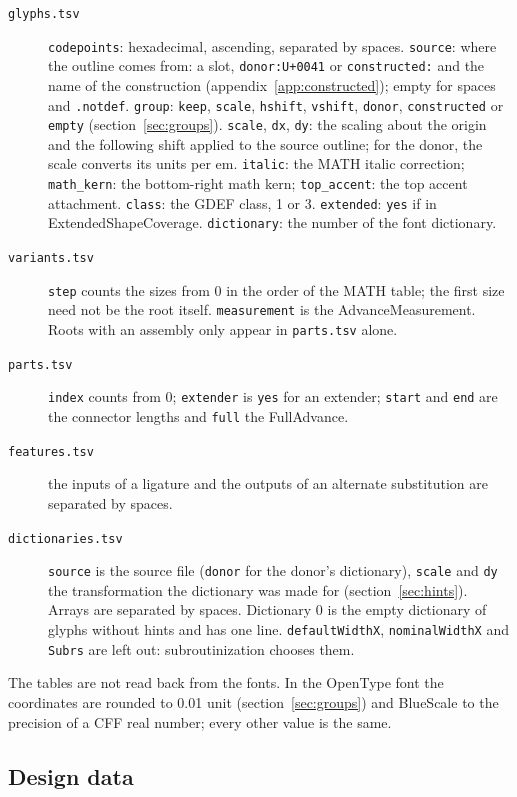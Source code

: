\documentclass[10pt]{article}
\newcommand\file[1]{\texttt{#1}}
\newcommand\code[1]{\texttt{#1}}
\begin{document}
\begin{description}
\item[\file{glyphs.tsv}] \code{codepoints}: hexadecimal, ascending,
  separated by spaces.  \code{source}: where the outline comes from:
  a slot, \code{donor:U+0041} or \code{constructed:} and the name of
  the construction (appendix~\ref{app:constructed}); empty for spaces
  and \code{.notdef}.  \code{group}: \code{keep}, \code{scale},
  \code{hshift}, \code{vshift}, \code{donor}, \code{constructed} or
  \code{empty} (section~\ref{sec:groups}).  \code{scale}, \code{dx},
  \code{dy}: the scaling about the origin and the following shift
  applied to the source outline; for the donor, the scale converts its
  units per em.  \code{italic}: the MATH italic correction;
  \code{math\_kern}: the bottom-right math kern; \code{top\_accent}:
  the top accent attachment.  \code{class}: the GDEF class, 1 or 3.
  \code{extended}: \code{yes} if in ExtendedShapeCoverage.
  \code{dictionary}: the number of the font dictionary.
\item[\file{variants.tsv}] \code{step} counts the sizes from 0 in the
  order of the MATH table; the first size need not be the root itself.
  \code{measurement} is the AdvanceMeasurement.  Roots with an assembly
  only appear in \file{parts.tsv} alone.
\item[\file{parts.tsv}] \code{index} counts from 0; \code{extender} is
  \code{yes} for an extender; \code{start} and \code{end} are the
  connector lengths and \code{full} the FullAdvance.
\item[\file{features.tsv}] the inputs of a ligature and the outputs of
  an alternate substitution are separated by spaces.
\item[\file{dictionaries.tsv}] \code{source} is the source file
  (\code{donor} for the donor's dictionary), \code{scale} and \code{dy}
  the transformation the dictionary was made for
  (section~\ref{sec:hints}).  Arrays are separated by spaces.
  Dictionary 0 is the empty dictionary of glyphs without hints and has
  one line.  \code{defaultWidthX}, \code{nominalWidthX} and \code{Subrs}
  are left out: subroutinization chooses them.
\end{description}

The tables are not read back from the fonts.  In the OpenType font the
coordinates are rounded to 0.01 unit (section~\ref{sec:groups}) and
BlueScale to the precision of a CFF real number; every other value is
the same.

\subsection{Design data}\label{sec:data}
\end{document}
